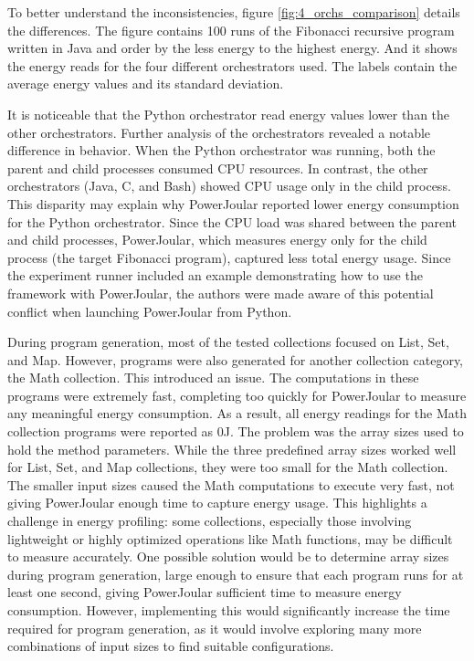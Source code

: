 To better understand the inconsistencies, figure \ref{fig:4_orchs_comparison} details the differences.
The figure contains 100 runs of the Fibonacci recursive program written in Java and order by the less energy to the highest energy. And it shows the energy reads for the four different orchestrators used. The labels contain the average energy values and its standard deviation.

It is noticeable that the Python orchestrator read energy values lower than the other orchestrators. Further analysis of the orchestrators revealed a notable difference in behavior. When the Python orchestrator was running, both the parent and child processes consumed CPU resources. In contrast, the other orchestrators (Java, C, and Bash) showed CPU usage only in the child process. This disparity may explain why PowerJoular reported lower energy consumption for the Python orchestrator. Since the CPU load was shared between the parent and child processes, PowerJoular, which measures energy only for the child process (the target Fibonacci program), captured less total energy usage.
Since the experiment runner included an example demonstrating how to use the framework with PowerJoular, the authors were made aware of this potential conflict when launching PowerJoular from Python.



During program generation, most of the tested collections focused on List, Set, and Map. However, programs were also generated for another collection category, the Math collection. This introduced an issue. The computations in these programs were extremely fast, completing too quickly for PowerJoular to measure any meaningful energy consumption. As a result, all energy readings for the Math collection programs were reported as 0J.
The problem was the array sizes used to hold the method parameters. While the three predefined array sizes worked well for List, Set, and Map collections, they were too small for the Math collection. The smaller input sizes caused the Math computations to execute very fast, not giving PowerJoular enough time to capture energy usage.
This highlights a challenge in energy profiling: some collections, especially those involving lightweight or highly optimized operations like Math functions, may be difficult to measure accurately. One possible solution would be to determine array sizes during program generation, large enough to ensure that each program runs for at least one second, giving PowerJoular sufficient time to measure energy consumption. However, implementing this would significantly increase the time required for program generation, as it would involve exploring many more combinations of input sizes to find suitable configurations.


